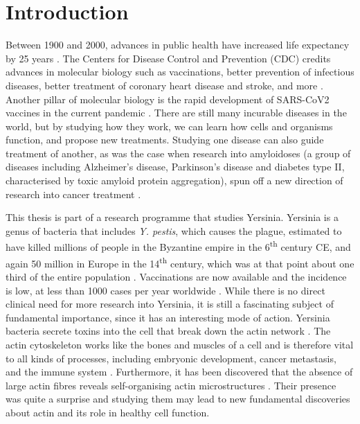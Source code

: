 \chapter{Introduction}
Between 1900 and 2000, advances in public health have increased life expectancy by 25 years \cite{Bunker1994}. The Centers for Disease Control and Prevention (CDC) credits advances in molecular biology such as vaccinations, better prevention of infectious diseases, better treatment of coronary heart disease and stroke, and more \cite{CDC1999}. Another pillar of molecular biology is the rapid development of SARS-CoV2 vaccines in the current pandemic \cite{Sadoff2021, Polack2020}. There are still many incurable diseases in the world, but by studying how they work, we can learn how cells and organisms function, and propose new treatments. Studying one disease can also guide treatment of another, as was the case when research into amyloidoses (a group of diseases including Alzheimer's disease, Parkinson's disease and diabetes type II, characterised by toxic amyloid protein aggregation), spun off a new direction of research into cancer treatment \cite{Gallardo2016}.

This thesis is part of a research programme that studies Yersinia. Yersinia is a genus of bacteria that includes \emph{Y. pestis}, which causes the plague, estimated to have killed millions of people in the Byzantine empire in the 6\textsuperscript{th} century CE, and again 50 million in Europe in the 14\textsuperscript{th} century, which was at that point about one third of the entire population \cite{Zietz2004}. Vaccinations are now available and the incidence is low, at less than 1000 cases per year worldwide \cite{WHO2014}. 
While there is no direct clinical need for more research into Yersinia, it is still a fascinating subject of fundamental importance, since it has an interesting mode of action. Yersinia bacteria secrete toxins into the cell that break down the actin network \cite{Ono2017}. The actin cytoskeleton works like the bones and muscles of a cell and is therefore vital to all kinds of processes, including embryonic development, cancer metastasis, and the immune system \cite{molbio, Horwitz2003, Umeda2016, Barnat2017, Lin2017}. Furthermore, it has been discovered that the absence of large actin fibres reveals self-organising actin microstructures \cite{Fritzsche2017a}. Their presence was quite a surprise and studying them may lead to new fundamental discoveries about actin and its role in healthy cell function.

